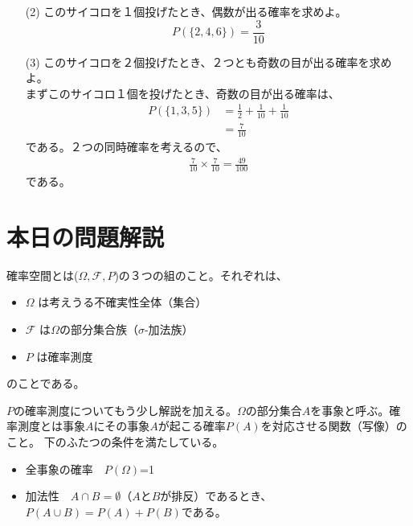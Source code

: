 \documentclass[a4j,uplatex]{jsarticle}
\begin{document}
\begin{itemize}
  \item[(2)] このサイコロを１個投げたとき、偶数が出る確率を求めよ。
  \begin{equation}
    P(\{2,4,6\})=\frac{3}{10}
  \end{equation} 
  \item[(3)] このサイコロを２個投げたとき、２つとも奇数の目が出る確率を求めよ。
    \\
    まずこのサイコロ１個を投げたとき、奇数の目が出る確率は、
  \begin{equation}
    \begin{split}
      P(\{1,3,5\})&=\frac{1}{2} + \frac{1}{10} + \frac{1}{10}\\
      &=\frac{7}{10}
    \end{split}
  \end{equation}  
  である。２つの同時確率を考えるので、
  \begin{equation}
    \begin{split}
      \frac{7}{10}\times \frac{7}{10} = \frac{49}{100}
    \end{split}
  \end{equation}  
  である。
\end{itemize}

\section*{本日の問題解説}
確率空間とは($ \Omega ,\mathscr F,P$)の３つの組のこと。それぞれは、
\begin{itemize}
  \item $\Omega$ は考えうる不確実性全体（集合）
  \item $\mathscr F$ は$\Omega$の部分集合族（$\sigma$-加法族）
  \item $P$ は確率測度
\end{itemize}
のことである。
\par $P$の確率測度についてもう少し解説を加える。$\Omega$の部分集合$A$を事象と呼ぶ。確率測度とは事象$A$にその事象$A$が起こる確率$P(A)$を対応させる関数（写像）のこと。
下のふたつの条件を満たしている。
\begin{itemize}
  \item 全事象の確率　$P(\Omega)$=1
  \item 加法性　$A\cap B=\emptyset$（$A$と$B$が排反）であるとき、$P(A\cup B)=P(A)+P(B)$である。
\end{itemize}
\end{document}

